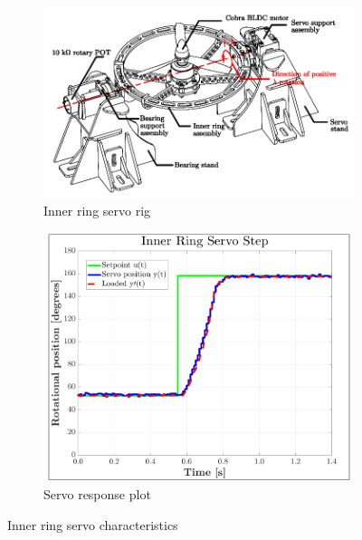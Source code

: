 \begin{figure}[htbp]
\vspace{-6pt}
\centering
\begin{subfigure}{0.73\textwidth}
\centering
\includegraphics[width=\textwidth]{figs/servo-inner}
\vspace{-10pt}
\caption{Inner ring servo rig}
\label{fig:servo-inner}
\vspace{3pt}
\end{subfigure}
\par
\begin{subfigure}{0.49\textwidth}
\centering
\includegraphics[width=\textwidth]{graphs/servo-step-inner}
\caption{Servo response plot}
\label{fig:servo-step-inner}
\end{subfigure}
\vspace{-4pt}
\caption{Inner ring servo characteristics}
\label{fig:servo-inner-character}
\vspace{-10pt}
\end{figure}
